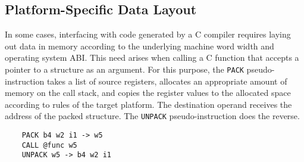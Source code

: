 \subsection{Platform-Specific Data Layout}

In some cases, interfacing with code generated by a C compiler
requires laying out data in memory according to the
underlying machine word width and operating system ABI.
This need arises when calling a C function that accepts
a pointer to a structure as an argument.
For this purpose, the \texttt{PACK} pseudo-instruction takes a list
of source registers, allocates an appropriate amount of memory
on the call stack, and copies the register values to the allocated
space according to rules of the target platform. The destination
operand receives the address of the packed structure.
The \texttt{UNPACK} pseudo-instruction does the reverse.

\begin{verbatim}
    PACK b4 w2 i1 -> w5
    CALL @func w5
    UNPACK w5 -> b4 w2 i1
\end{verbatim}
